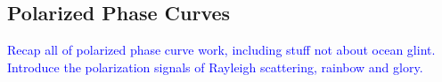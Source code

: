 \documentclass[
    usenatbib,
]{mnras}
\begin{document}









\subsection{Polarized Phase Curves}
\textcolor{blue}{Recap all of polarized phase curve work, including stuff not about ocean glint. Introduce the polarization signals of Rayleigh scattering, rainbow and glory.}
\end{document}
